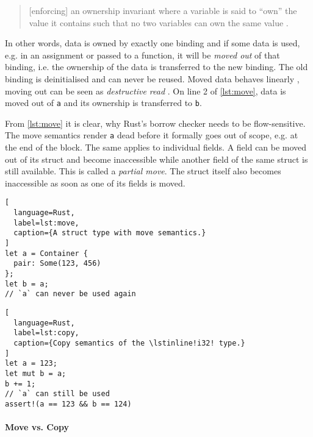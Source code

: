 \begin{quote}
{[enforcing]} an ownership invariant where a
variable is said to ``own'' the value it contains such that no two variables can
own the same value \cite[page 5]{lightweight-formalism}.
\end{quote}

In other words, data is owned by exactly one binding and if some data is used,
e.g. in an assignment or passed to a function, it will be \emph{moved out} of
that binding, i.e. the ownership of the data is transferred to the new binding.
The old binding is deinitialised and can never be reused. Moved data behaves
linearly \cite{oxide}, moving out can be seen as \emph{destructive read}
\cite{islands-alias-protection}. On line 2 of \autoref{lst:move}, data is moved
out of \lstinline!a! and its ownership is transferred to \lstinline!b!.

From \autoref{lst:move} it is clear, why Rust's borrow checker needs to be
flow-sensitive. The move semantics render \lstinline!a! dead before it formally
goes out of scope, e.g. at the end of the block. The same applies to individual
fields. A field can be moved out of its struct and become inaccessible while
another field of the same struct is still available. This is called a
\emph{partial move}. The struct itself also becomes inaccessible as soon as one
of its fields is moved.

\noindent\begin{minipage}[t]{.47\textwidth}
\begin{lstlisting}[
  language=Rust,
  label=lst:move,
  caption={A struct type with move semantics.}
]
let a = Container {
  pair: Some(123, 456)
};
let b = a;
// `a` can never be used again
\end{lstlisting}
\end{minipage}\hfill
\begin{minipage}[t]{.47\textwidth}
\begin{lstlisting}[
  language=Rust,
  label=lst:copy,
  caption={Copy semantics of the \lstinline!i32! type.}
]
let a = 123;
let mut b = a;
b += 1;
// `a` can still be used
assert!(a == 123 && b == 124)
\end{lstlisting}
\end{minipage}

\paragraph{Move vs. Copy}

